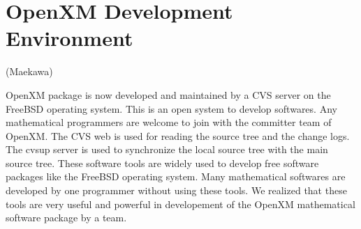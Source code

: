 
\section{OpenXM Development Environment}  (Maekawa)

OpenXM package is now developed and maintained by
a CVS server on the FreeBSD operating system.
This is an open system to develop softwares.
Any mathematical programmers are welcome to
join with the committer team of OpenXM.
The CVS web is used for reading the source tree and the change logs.
The cvsup server is used to synchronize the local source tree with
the main source tree.
These software tools are widely used to develop free software packages
like the FreeBSD operating system.
Many mathematical softwares are developed by one programmer
without using these tools.
We realized that these tools are very useful and powerful in developement
of the OpenXM mathematical software package by a team.
